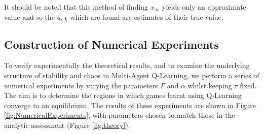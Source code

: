 \documentclass[sigconf,anonymous]{aamas}
\newcommand{\xfixed}{x_\infty}
\begin{document}
It should be noted that this method of finding $\xfixed$ yields only
an approximate value and so the $q, \chi$ which are found are
estimates of their true value.


\subsection{Construction of Numerical Experiments}

To verify experimentally the theoretical results, and to examine the underlying structure of stability and chaos in
Multi-Agent Q-Learning, we perform a series of numerical experiments by varying the parameters $\Gamma$ and
$\alpha$ whilst keeping $\tau$ fixed. The aim is to determine the regions in which games learnt using Q-Learning converge to an equilibrium. The results of these experiments are shown in Figure \ref{fig:NumericalExperiments}, with parameters chosen to match those in the analytic assessment (Figure \ref{fig:theory}).



\end{document}
